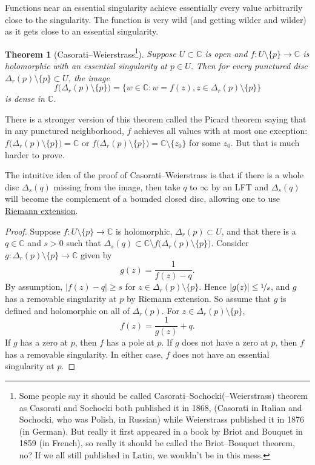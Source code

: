 \documentclass[12pt,openany]{book}
\newcommand{\sabs}[1]{\lvert {#1} \rvert}
\newcommand{\C}{{\mathbb{C}}}
\theoremstyle{plain}
\newtheorem{thm}{Theorem}[section]
\theoremstyle{remark}
\theoremstyle{definition}
\theoremstyle{exercise}
\theoremstyle{example}
\begin{document}
Functions near an essential singularity achieve essentially every value
arbitrarily close to the singularity.  The function is very wild (and
getting wilder and wilder) as it gets close to an essential singularity.

\begin{thm}[Casorati--Weierstrass\footnote{%
Some people say it should be called Casorati--Sochocki(--Weierstrass) theorem as
Casorati and Sochocki both published it in 1868, (Casorati in Italian
and Sochocki, who was Polish, in Russian) while Weierstrass published it in 1876 (in
German).  But really it first appeared in a book by Briot and Bouquet in
1859 (in French), so really it should be called the Briot--Bouquet theorem,
no?  If we all still published in Latin, we wouldn't be in this
mess.}]\label{thm:casoratiweierstrass}
Suppose $U \subset \C$ is open and $f \colon U \setminus \{ p \} \to \C$ is
holomorphic with
an essential singularity at $p \in U$.  Then for every punctured disc
$\Delta_r(p) \setminus \{ p \} \subset U$, the image
\begin{equation*}
f\bigl(\Delta_r(p) \setminus \{ p \} \bigr)
=
\bigl\{ w \in \C : w = f(z), z \in \Delta_r(p) \setminus \{ p \} \bigr\}
\end{equation*}
is dense in $\C$.
\end{thm}

There is a stronger version
of this theorem called the Picard theorem saying that in any
punctured neighborhood, $f$ achieves all values with at most one exception:
$f\bigl(\Delta_r(p) \setminus \{ p \} \bigr) = \C$ or 
$f\bigl(\Delta_r(p) \setminus \{ p \} \bigr) = \C \setminus \{ z_0 \}$ for
some $z_0$.
But that is much harder to prove.

The intuitive idea of the proof of Casorati--Weierstrass is that if there
is a whole disc $\Delta_s(q)$ missing from the image, then take $q$ to
$\infty$ by an LFT and $\Delta_s(q)$ will become the complement of a bounded
closed disc, allowing one to use
\hyperref[thm:riemannext]{Riemann extension}.

\begin{proof}
Suppose $f \colon U \setminus \{ p \} \to \C$ is holomorphic,
$\Delta_r(p) \subset U$,
and that
there is a $q \in \C$ and $s > 0$ such that $\Delta_s(q) \subset \C
\setminus 
f\bigl(\Delta_r(p) \setminus \{ p \} \bigr)$.
Consider $g \colon \Delta_r(p) \setminus \{p\} \to \C$ given by
\begin{equation*}
g(z) = \frac{1}{f(z) - q} .
\end{equation*}
By assumption, $\sabs{f(z)-q} \geq s$ for $z \in \Delta_r(p) \setminus
\{p\}$.
Hence $\sabs{g(z)} \leq \nicefrac{1}{s}$, and $g$ has a removable
singularity at $p$ by Riemann extension.  So
assume that $g$ is defined and holomorphic on all of
$\Delta_r(p)$.  For $z \in \Delta_r(p) \setminus \{ p \}$,
\begin{equation*}
f(z) = \frac{1}{g(z)} + q .
\end{equation*}
If $g$ has a zero at $p$, then $f$ has a pole at $p$.  If $g$ does not
have a zero at $p$, then $f$ has a removable singularity.  In either case,
$f$ does not have an essential singularity at $p$.
\end{proof}
\end{document}
